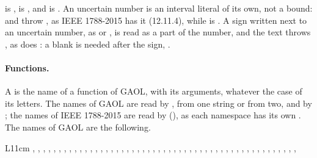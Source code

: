 \documentclass[12pt,a4paper,twoside,openright]{book}
\begin{document}
\noindent
{} is ,  is , and
 is .\newinvfive{} An uncertain number is an
interval literal of its own, not a bound:  and
 throw , as IEEE 1788-2015
has it (12.11.4), while  is . A sign written
next to an uncertain number, as  or , is
read as a part of the number, and the text throws
, as does : a blank is needed
after the sign, .\newinvfive

\paragraph{Functions.} A  is the name of a function of GAOL, with
its arguments, whatever the case of its letters. The names of GAOL are read
by , from one string or from two, and by
; the names of IEEE 1788-2015 are read by
 (), as
each namespace has its own .\newinvfive{} The names of GAOL are
the following.

\begin{center}\small
\begin{tabular}{L{11cm}}
, , , , ,
, , , , ,
, , , , ,
, , , , ,
, , , , ,
, , , , ,
, , , , ,
, , , ,
, , , , ,
, , ,
, , , , \\
\end{tabular}
\end{center}
\end{document}
